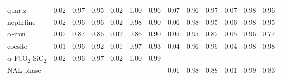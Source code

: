 \begin{table}[!htbp]
\begin{tabular}{@{}l|rrr|rrr|rrr|rrr@{}}
quartz & 0.02 & \cellcolor[RGB]{252,236,235}0.97 & \cellcolor[RGB]{249,218,216}0.95 & 0.02 & \cellcolor[RGB]{255,253,253}1.00 & \cellcolor[RGB]{251,231,230}0.96 & 0.07 & \cellcolor[RGB]{251,231,229}0.96 & \cellcolor[RGB]{251,234,232}0.97 & 0.07 & \cellcolor[RGB]{253,241,240}0.98 & \cellcolor[RGB]{250,227,226}0.96 \\
nepheline & 0.02 & \cellcolor[RGB]{250,226,224}0.96 & \cellcolor[RGB]{251,230,228}0.96 & 0.02 & \cellcolor[RGB]{252,238,237}0.98 & \cellcolor[RGB]{244,191,187}0.90 & 0.06 & \cellcolor[RGB]{253,240,240}0.98 & \cellcolor[RGB]{249,221,219}0.95 & 0.06 & \cellcolor[RGB]{252,238,237}0.98 & \cellcolor[RGB]{249,220,218}0.95 \\
$\alpha$-iron & 0.02 & \cellcolor[RGB]{240,168,163}0.87 & \cellcolor[RGB]{239,161,155}0.86 & 0.02 & \cellcolor[RGB]{238,157,152}0.86 & \cellcolor[RGB]{243,187,183}0.90 & 0.05 & \cellcolor[RGB]{250,224,222}0.95 & \cellcolor[RGB]{234,134,127}0.82 & 0.05 & \cellcolor[RGB]{251,230,229}0.96 & \cellcolor[RGB]{232,120,112}0.77 \\
coesite & 0.01 & \cellcolor[RGB]{251,230,229}0.96 & \cellcolor[RGB]{246,201,198}0.92 & 0.01 & \cellcolor[RGB]{252,236,235}0.97 & \cellcolor[RGB]{247,207,204}0.93 & 0.04 & \cellcolor[RGB]{250,227,225}0.96 & \cellcolor[RGB]{254,247,246}0.99 & 0.04 & \cellcolor[RGB]{252,239,238}0.98 & \cellcolor[RGB]{252,239,238}0.98 \\
$\alpha$-PbO$_2$-SiO$_2$ & 0.02 & \cellcolor[RGB]{250,226,224}0.96 & \cellcolor[RGB]{252,238,237}0.97 & 0.02 & \cellcolor[RGB]{255,252,252}1.00 & \cellcolor[RGB]{253,245,244}0.99 & -- & -- & -- & -- & -- & -- \\
NAL phase & -- & -- & -- & -- & -- & -- & 0.01 & \cellcolor[RGB]{253,242,241}0.98 & \cellcolor[RGB]{242,177,172}0.88 & 0.01 & \cellcolor[RGB]{254,250,250}0.99 & \cellcolor[RGB]{235,138,131}0.83 \\
\bottomrule
\end{tabular}
\end{table}
